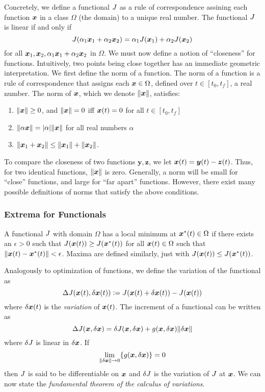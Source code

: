 Concretely, we define a functional $J$ as a rule of correspondence assining each function $\bm{x}$ in a class $\Omega$ (the domain) to a unique real number. The functional $J$ is linear if and only if 
\begin{equation}
    J(\alpha_1 \bm{x}_1 + \alpha_2 \bm{x}_2) = \alpha_1 J(\bm{x}_1) + \alpha_2 J(\bm{x}_2)
\end{equation}
for all $\bm{x}_1, \bm{x}_2, \alpha_1 \bm{x}_1 + \alpha_2 \bm{x}_2$ in $\Omega$. We must now define a notion of ``closeness'' for functions. Intuitively, two points being close together has an immediate geometric interpretation. We first define the norm of a function. The norm of a function is a rule of correspondence that assigns each $\bm{x} \in \Omega$, defined over $t \in [t_0,t_f]$, a real number. The norm of $\bm{x}$, which we denote $\|\bm{x}\|$, satisfies:
\begin{enumerate}
    \item $\|\bm{x}\| \geq 0$, and $\|\bm{x}\|=0$ iff $\bm{x}(t) = 0$ for all $t \in [t_0,t_f]$
    \item $\|\alpha \bm{x}\| = |\alpha| \|\bm{x}\|$ for all real numbers $\alpha$
    \item $\|\bm{x}_1 + \bm{x}_2\| \leq \|\bm{x}_1\| + \|\bm{x}_2\|$.
\end{enumerate}
To compare the closeness of two functions $\bm{y}, \bm{z}$, we let $\bm{x}(t) = \bm{y}(t) - \bm{z}(t)$. Thus, for two identical functions, $\|\bm{x}\|$ is zero. Generally, a norm will be small for ``close'' functions, and large for ``far apart'' functions. However, there exist many possible definitions of norms that satisfy the above conditions. 

\subsubsection{Extrema for Functionals}

A functional $J$ with domain $\Omega$ has a local minimum at $\bm{x}^*(t) \in \Omega$ if there exists an $\epsilon > 0$ such that $J(\bm{x}(t)) \geq J(\bm{x}^*(t))$ for all $\bm{x}(t) \in \Omega$ such that $\|\bm{x}(t) - \bm{x}^*(t)\| < \epsilon$. Maxima are defined similarly, just with $J(\bm{x}(t)) \leq J(\bm{x}^*(t))$. 

Analogously to optimization of functions, we define the variation of the functional as
\begin{equation}
    \Delta J(\bm{x}(t),\delta \bm{x}(t)) \vcentcolon= J(\bm{x}(t) + \delta \bm{x}(t)) - J(\bm{x}(t))
\end{equation}
where $\delta \bm{x}(t)$ is the \textit{variation} of $\bm{x}(t)$. The increment of a functional can be written as 
\begin{equation}
    \Delta J(\bm{x},\delta \bm{x}) = \delta J(\bm{x},\delta \bm{x}) + g(\bm{x},\delta \bm{x}) \|\delta \bm{x}\|
\end{equation}
where $\delta J$ is linear in $\delta \bm{x}$. If 
\begin{equation}
    \lim_{\|\delta \bm{x} \| \to 0} \{g(\bm{x},\delta \bm{x})\} = 0
\end{equation}
then $J$ is said to be differentiable on $\bm{x}$ and $\delta J$ is the variation of $J$ at $\bm{x}$. 
We can now state the \textit{fundamental theorem of the calculus of variations}. 

